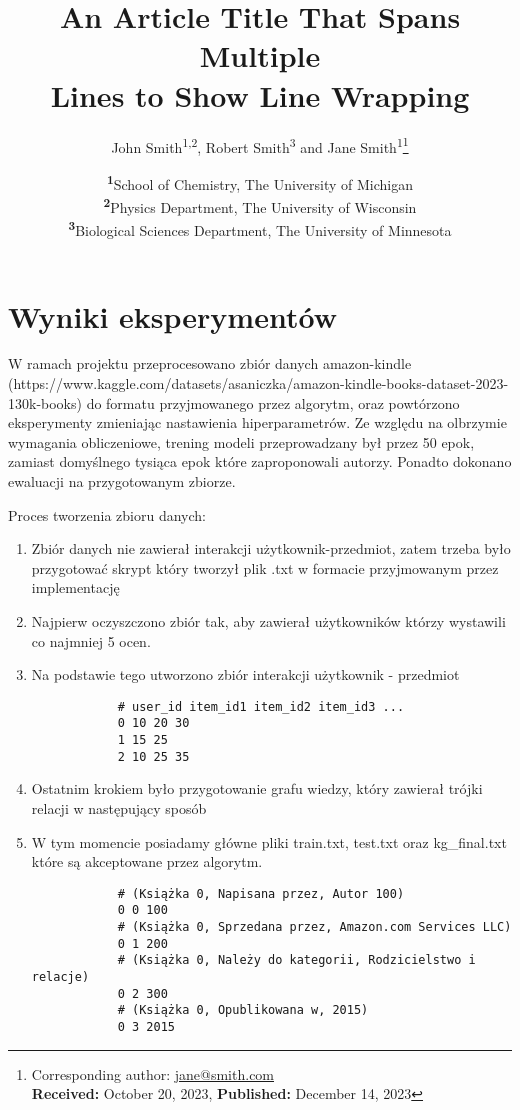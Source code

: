 \documentclass[a4paper]{LTJournalArticle}
\title{An Article Title That Spans Multiple\\ Lines to Show Line Wrapping} %
\author{%
	John Smith\textsuperscript{1,2}, Robert Smith\textsuperscript{3} and Jane Smith\textsuperscript{1}\thanks{Corresponding author: \href{mailto:jane@smith.com}{jane@smith.com}\\ \textbf{Received:} October 20, 2023, \textbf{Published:} December 14, 2023}
}
\date{\footnotesize\textsuperscript{\textbf{1}}School of Chemistry, The University of Michigan\\ \textsuperscript{\textbf{2}}Physics Department, The University of Wisconsin\\ \textsuperscript{\textbf{3}}Biological Sciences Department, The University of Minnesota}
\begin{document}
	
	\maketitle %
	

	\section{Wyniki eksperymentów}
	W ramach projektu przeprocesowano zbiór danych amazon-kindle (https://www.kaggle.com/datasets/asaniczka/amazon-kindle-books-dataset-2023-130k-books) do formatu przyjmowanego przez algorytm, oraz powtórzono eksperymenty zmieniając nastawienia hiperparametrów. Ze względu na olbrzymie wymagania obliczeniowe, trening modeli przeprowadzany był przez 50 epok, zamiast domyślnego tysiąca epok które zaproponowali autorzy. Ponadto dokonano ewaluacji na przygotowanym zbiorze.
	
	
	Proces tworzenia zbioru danych:
	\begin{enumerate}
		\item Zbiór danych nie zawierał interakcji użytkownik-przedmiot, zatem trzeba było przygotować skrypt który tworzył plik .txt w formacie przyjmowanym przez implementację
		
		\item Najpierw oczyszczono zbiór tak, aby zawierał użytkowników którzy wystawili co najmniej 5 ocen.
		
		\item Na podstawie tego utworzono zbiór interakcji użytkownik - przedmiot  
		
		\begin{verbatim}
			# user_id item_id1 item_id2 item_id3 ...
			0 10 20 30
			1 15 25
			2 10 25 35
		\end{verbatim}

	
		\item Ostatnim krokiem było przygotowanie grafu wiedzy, który zawierał trójki relacji w następujący sposób  

	
		\item W tym momencie posiadamy główne pliki train.txt, test.txt oraz kg\_final.txt które są akceptowane przez algorytm.
		
		\begin{verbatim}
			# (Książka 0, Napisana przez, Autor 100)
			0 0 100   
			# (Książka 0, Sprzedana przez, Amazon.com Services LLC)
			0 1 200   
			# (Książka 0, Należy do kategorii, Rodzicielstwo i relacje)
			0 2 300   
			# (Książka 0, Opublikowana w, 2015)
			0 3 2015  
		\end{verbatim}
	
	\end{enumerate}
\end{document}
